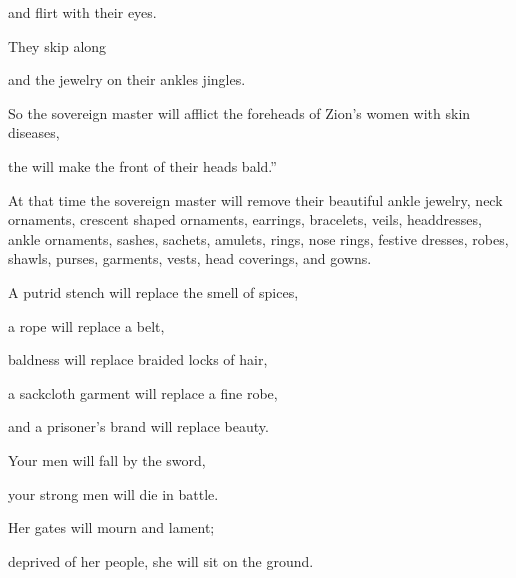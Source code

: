 {\par }{\Q and flirt
with their
eyes.
\par }{\Q They skip
along

\par }{\Q and the jewelry on their ankles
jingles.
\par }{\Q {}So the sovereign master
will afflict
the foreheads
of Zion’s
women
with skin diseases,

\par }{\Q the {}
will make the front
of their heads
bald.”
\par }{\PP At that
time
the sovereign master
will remove
their beautiful
ankle
jewelry, neck
ornaments,
crescent shaped ornaments,
earrings,
bracelets,
veils,
headdresses,
ankle ornaments,
sashes,
sachets, amulets,
rings,
nose
rings,
festive dresses,
robes,
shawls,
purses,
garments,
vests,
head coverings,
and gowns.
\par }{\Q {}A putrid stench
will replace
the smell
of spices,
\par }{\Q a rope
will replace
a belt,
\par }{\Q baldness
will replace
braided
locks
of hair,
\par }{\Q a sackcloth
garment
will replace
a fine robe,
\par }{\Q and a prisoner’s brand
will replace
beauty.
\par }{\Q {}Your men
will fall
by the sword,
\par }{\Q your strong men
will die in battle.
\par }{\Q {}Her gates
will mourn
and lament;
\par }{\Q deprived
of her people, she will sit
on the ground.

}
